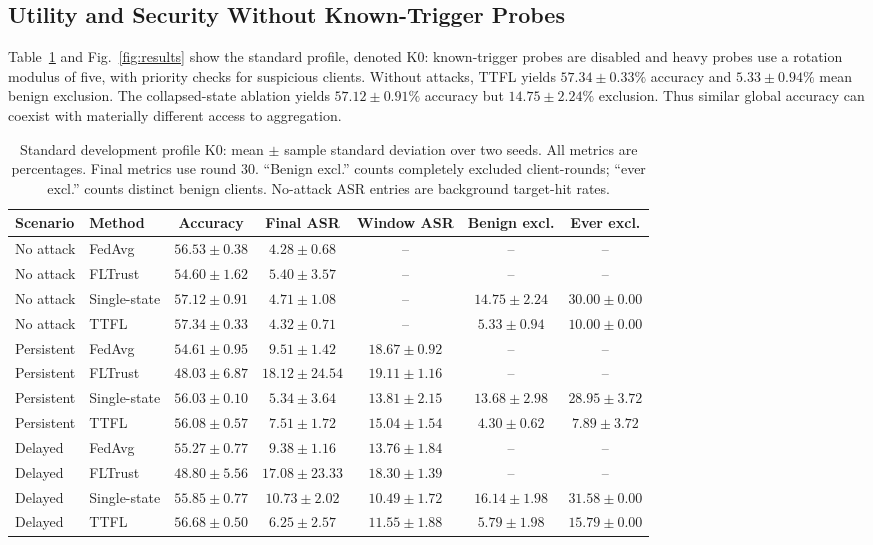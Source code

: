 \documentclass[conference,compsoc]{IEEEtran}
\begin{document}
\subsection{Utility and Security Without Known-Trigger Probes}
Table~\ref{tab:main} and Fig.~\ref{fig:results} show the standard profile, denoted K0: known-trigger probes are disabled and heavy probes use a rotation modulus of five, with priority checks for suspicious clients. Without attacks, TTFL yields $57.34\pm0.33\%$ accuracy and $5.33\pm0.94\%$ mean benign exclusion. The collapsed-state ablation yields $57.12\pm0.91\%$ accuracy but $14.75\pm2.24\%$ exclusion. Thus similar global accuracy can coexist with materially different access to aggregation.

\begin{table}[t]
\caption{Standard development profile K0: mean $\pm$ sample standard deviation over two seeds. All metrics are percentages. Final metrics use round 30. ``Benign excl.'' counts completely excluded client-rounds; ``ever excl.'' counts distinct benign clients. No-attack ASR entries are background target-hit rates.}
\label{tab:main}
\centering\footnotesize
\setlength{\tabcolsep}{4pt}
\begin{tabular*}{\textwidth}{@{\extracolsep{\fill}}llccccc@{}}
\toprule
Scenario & Method & Accuracy & Final ASR & Window ASR & Benign excl. & Ever excl.\\
\midrule
No attack & FedAvg & $56.53\pm0.38$ & $4.28\pm0.68$ & -- & -- & -- \\
No attack & FLTrust & $54.60\pm1.62$ & $5.40\pm3.57$ & -- & -- & -- \\
No attack & Single-state & $57.12\pm0.91$ & $4.71\pm1.08$ & -- & $14.75\pm2.24$ & $30.00\pm0.00$ \\
No attack & TTFL & $57.34\pm0.33$ & $4.32\pm0.71$ & -- & $5.33\pm0.94$ & $10.00\pm0.00$ \\
\midrule
Persistent & FedAvg & $54.61\pm0.95$ & $9.51\pm1.42$ & $18.67\pm0.92$ & -- & -- \\
Persistent & FLTrust & $48.03\pm6.87$ & $18.12\pm24.54$ & $19.11\pm1.16$ & -- & -- \\
Persistent & Single-state & $56.03\pm0.10$ & $5.34\pm3.64$ & $13.81\pm2.15$ & $13.68\pm2.98$ & $28.95\pm3.72$ \\
Persistent & TTFL & $56.08\pm0.57$ & $7.51\pm1.72$ & $15.04\pm1.54$ & $4.30\pm0.62$ & $7.89\pm3.72$ \\
\midrule
Delayed & FedAvg & $55.27\pm0.77$ & $9.38\pm1.16$ & $13.76\pm1.84$ & -- & -- \\
Delayed & FLTrust & $48.80\pm5.56$ & $17.08\pm23.33$ & $18.30\pm1.39$ & -- & -- \\
Delayed & Single-state & $55.85\pm0.77$ & $10.73\pm2.02$ & $10.49\pm1.72$ & $16.14\pm1.98$ & $31.58\pm0.00$ \\
Delayed & TTFL & $56.68\pm0.50$ & $6.25\pm2.57$ & $11.55\pm1.88$ & $5.79\pm1.98$ & $15.79\pm0.00$ \\
\bottomrule
\end{tabular*}
\end{table}
\end{document}

